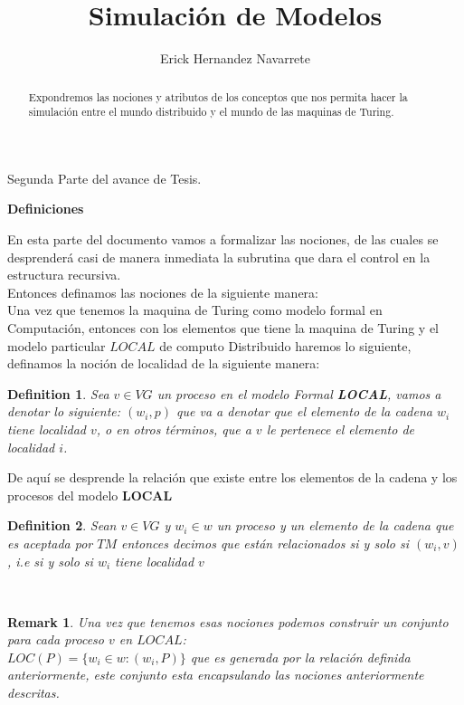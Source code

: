\documentclass[10pt]{article}
\author{Erick Hernandez Navarrete}
\title{Simulación de Modelos}
\newtheorem*{remark}{Remark}
\newtheorem{definition}{Definition}
\begin{document}
    \begin{titlepage}
        \begin{Large}
            Segunda Parte del avance de Tesis.
        \end{Large}
    \end{titlepage}

    \begin{abstract}
        Expondremos las nociones y atributos de los conceptos que nos permita
        hacer la simulación entre el mundo distribuido y el mundo de las maquinas
        de Turing.
    \end{abstract}
    \space
    \begin{center}
        \textbf{Definiciones}
    \end{center}
    En esta parte del documento vamos a formalizar las nociones, de las cuales se desprenderá casi de manera
    inmediata la subrutina que dara el control en la estructura recursiva.\\
    Entonces definamos las nociones de la siguiente manera:
    \\
    Una vez que tenemos la maquina de Turing como modelo formal en Computación, entonces con los elementos que tiene la
    maquina de Turing y el modelo particular $LOCAL$ de computo Distribuido haremos lo siguiente, definamos la noción de localidad de la siguiente manera:

    \theoremstyle{definition}
    \begin{definition}
        Sea $v \in VG$ un proceso en el modelo Formal \textbf{LOCAL}, vamos a denotar lo siguiente:
        $(w_{i},p)$ que va a denotar que el elemento de la cadena $w_{i}$ tiene localidad $v$,
        o en otros términos, que a $v$ le pertenece el elemento de localidad $i$.
    \end{definition}
    De aquí se desprende la relación que existe entre los elementos de la cadena y los procesos
    del modelo $\textbf{LOCAL}$

    \theoremstyle{definition}
    \begin{definition}
        Sean $v \in VG$ y $w_{i} \in w$ un proceso y un elemento de la cadena que es aceptada por $TM$
        entonces decimos que están relacionados si y solo si $(w_{i},v)$, i.e si y solo si $w_{i}$ tiene localidad $v$
    \end{definition}
    \\
    \begin{remark}
        Una vez que tenemos esas nociones podemos construir un conjunto para cada proceso $v$ en $LOCAL$:\\
        $LOC(P) = \{w_{i} \in w : (w_{i},P)\}$  que es generada por la relación definida anteriormente,
        este conjunto esta encapsulando las nociones anteriormente descritas.
    \end{remark}
\end{document}
